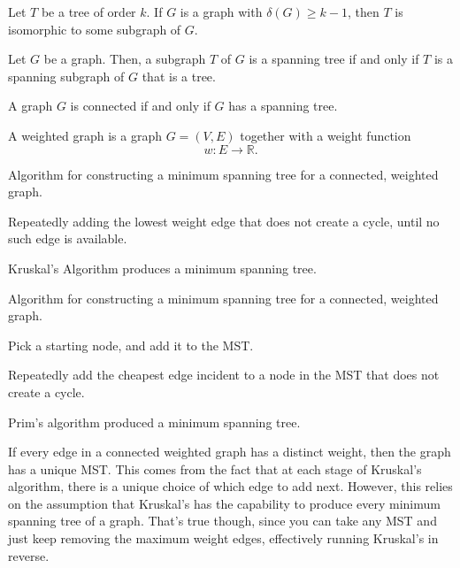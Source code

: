 \documentclass{article}
\begin{document}
\medskip{}

    Let $T$ be a tree of order $k$.
    If $G$ is a graph with $\delta(G) \geq k - 1$, then $T$ is isomorphic to some subgraph of $G$.

\medskip{}

    Let $G$ be a graph. Then, a subgraph $T$ of $G$ is a spanning tree if and only if $T$ is a spanning subgraph of $G$ that is a tree.

\medskip{}

    A graph $G$ is connected if and only if $G$ has a spanning tree.

\medskip{}

    A weighted graph is a graph $G=(V,E)$ together with a weight function $$w: E \to \mathbb R.$$

\medskip{}
    Algorithm for constructing a minimum spanning tree for a connected, weighted graph.

    Repeatedly adding the lowest weight edge that does not create a cycle, until no such edge is available.

\medskip{}

    Kruskal's Algorithm produces a minimum spanning tree.

\medskip{}
    Algorithm for constructing a minimum spanning tree for a connected, weighted graph.

    Pick a starting node, and add it to the MST.

    Repeatedly add the cheapest edge incident to a node in the MST that does not create a cycle.

\medskip{}

    Prim's algorithm produced a minimum spanning tree.

\medskip{}

    If every edge in a connected weighted graph has a distinct weight, then the graph has a unique MST. 
    This comes from the fact that at each stage of Kruskal's algorithm, there is a unique choice of which edge to add next. 
    However, this relies on the assumption that Kruskal's has the capability to produce every minimum spanning tree of a graph. 
    That's true though, since you can take any MST and just keep removing the maximum weight edges, effectively running Kruskal's in reverse.
\end{document}

